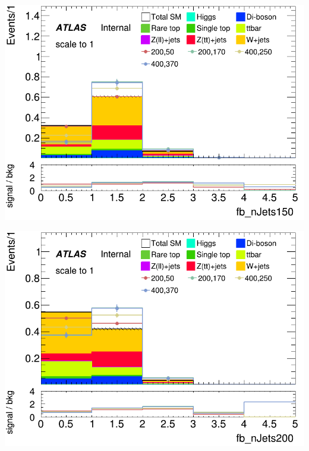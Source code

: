 \documentclass[usenames,dvipsnames]{beamer}
\begin{document}
\begin{frame}
\begin{minipage}{0.25\textwidth}
        \centering
        \includegraphics[width=\textwidth]{graphics/LH_met_sig/LH_fb_nJets150_norm.png}
    \end{minipage}
    \hfill
    \begin{minipage}{0.25\textwidth}
        \centering
        \includegraphics[width=\textwidth]{graphics/LH_met_sig/LH_fb_nJets200_norm.png}
    \end{minipage}
     
    \vspace{0.5cm} %


\end{frame}
\end{document}
